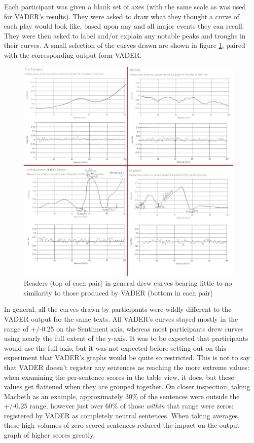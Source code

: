 \documentclass{article}
\begin{document}
            Each participant was given a blank set of axes (with the same scale as was used for VADER's results). They were asked to draw what they thought a curve of each play would look like, based upon any and all major events they can recall. They were then asked to label and/or explain any notable peaks and troughs in their curves. A small selection of the curves drawn are shown in figure \ref{fig:readerVsVader}, paired with the corresponding output form VADER.
            \begin{figure}[ht]
                \includegraphics[width=1\textwidth]{Figures/Survey/readerVsVader}
                \centering
                \caption{Readers (top of each pair) in general drew curves bearing little to no similarity to those produced by VADER (bottom in each pair)}
                \label{fig:readerVsVader}
            \end{figure}
            In general, all the curves drawn by participants were wildly different to the VADER output for the same texts. All VADER's curves stayed mostly in the range of +/-0.25 on the Sentiment axis, whereas most participants drew curves using nearly the full extent of the y-axis. It was to be expected that participants would use the full axis, but it was not expected before setting out on this experiment that VADER's graphs would be quite so restricted. This is not to say that VADER doesn't register any sentences as reaching the more extreme values: when examining the per-sentence scores in the table view, it does, but these values get flattened when they are grouped together. On closer inspection, taking Macbeth as an example, approximately 30\% of the sentences were outside the +/-0.25 range, however  just over 60\% of those \textit{within} that range were zeros: registered by VADER as completely neutral sentences. When taking averages, these high volumes of zero-scored sentences reduced the impact on the output graph of higher scores greatly.
\end{document}

